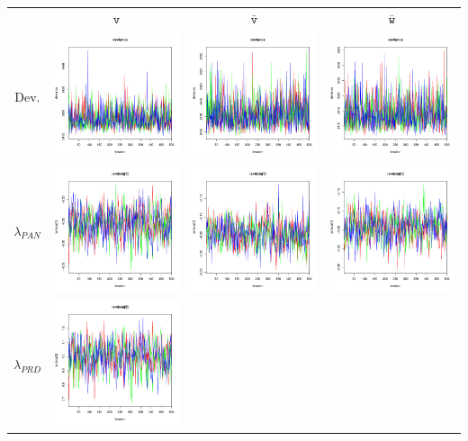 \documentclass[letter,12pt]{article}
\begin{document}
\begin{table}
\centering
\begin{tabular}{cccc}
                     & $\texttt{v}$ & $\bar{\texttt{v}}$ & $\bar{\texttt{w}}$ \\ 
    Dev.             & \includegraphics[width=.15\columnwidth]{../graphs/traceplots/2009d0v_1.pdf} &
                        \includegraphics[width=.15\columnwidth]{../graphs/traceplots/2009d0vbar_1.pdf} &
                         \includegraphics[width=.15\columnwidth]{../graphs/traceplots/2009d0wbar_1.pdf} \\
    $\lambda_{PAN}$   & \includegraphics[width=.15\columnwidth]{../graphs/traceplots/2009d0v_2.pdf} &
                        \includegraphics[width=.15\columnwidth]{../graphs/traceplots/2009d0vbar_2.pdf} &
                         \includegraphics[width=.15\columnwidth]{../graphs/traceplots/2009d0wbar_2.pdf} \\
    $\lambda_{PRD}$   & \includegraphics[width=.15\columnwidth]{../graphs/traceplots/2009d0v_3.pdf} &

\end{tabular}
\end{table}
\end{document}

